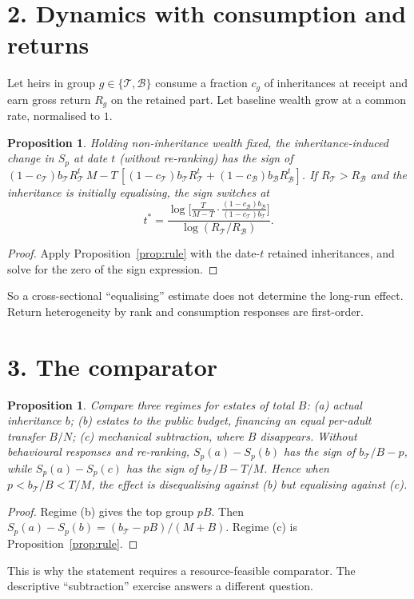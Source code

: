 \documentclass[11pt]{article}
\newtheorem{proposition}[theorem]{Proposition}
\theoremstyle{definition}
\begin{document}
\section*{2. Dynamics with consumption and returns}
Let heirs in group $g\in\{\mathcal T,\mathcal B\}$ consume a fraction $c_g$ of inheritances at receipt and earn gross return
$R_g$ on the retained part. Let baseline wealth grow at a common rate, normalised to $1$.
\begin{proposition}\label{prop:time}
Holding non-inheritance wealth fixed, the inheritance-induced change in $S_p$ at date $t$ (without re-ranking) has the sign
of $(1-c_{\mathcal T})b_{\mathcal T}R_{\mathcal T}^t\,M-T\,[(1-c_{\mathcal T})b_{\mathcal T}R_{\mathcal T}^t+(1-c_{\mathcal B})b_{\mathcal B}R_{\mathcal B}^t]$.
If $R_{\mathcal T}>R_{\mathcal B}$ and the inheritance is initially equalising, the sign switches at
\[
 t^*=\frac{\log\bigl[\frac{T}{M-T}\cdot\frac{(1-c_{\mathcal B})b_{\mathcal B}}{(1-c_{\mathcal T})b_{\mathcal T}}\bigr]}{\log(R_{\mathcal T}/R_{\mathcal B})}.
\]
\end{proposition}
\begin{proof}
Apply Proposition~\ref{prop:rule} with the date-$t$ retained inheritances, and solve for the zero of the sign expression.
\end{proof}
So a cross-sectional ``equalising'' estimate does not determine the long-run effect. Return heterogeneity by rank and
consumption responses are first-order.

\section*{3. The comparator}
\begin{proposition}\label{prop:comp}
Compare three regimes for estates of total $B$: (a) actual inheritance $b$; (b) estates to the public budget, financing an
equal per-adult transfer $B/N$; (c) mechanical subtraction, where $B$ disappears. Without behavioural responses and
re-ranking, $S_p(a)-S_p(b)$ has the sign of $b_{\mathcal T}/B-p$, while $S_p(a)-S_p(c)$ has the sign of $b_{\mathcal T}/B-T/M$.
Hence when $p<b_{\mathcal T}/B<T/M$, the effect is disequalising against (b) but equalising against (c).
\end{proposition}
\begin{proof}
Regime (b) gives the top group $pB$. Then $S_p(a)-S_p(b)=(b_{\mathcal T}-pB)/(M+B)$. Regime (c) is Proposition~\ref{prop:rule}.
\end{proof}
This is why the statement requires a resource-feasible comparator. The descriptive ``subtraction'' exercise answers a
different question.
\end{document}
